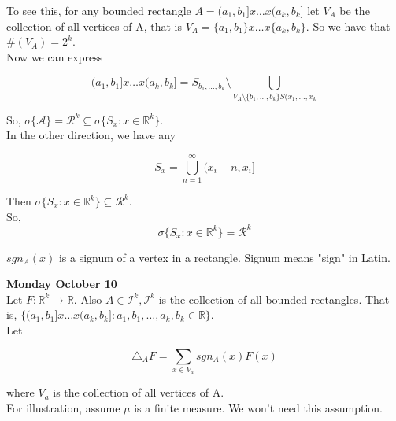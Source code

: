 \documentclass[11pt,fleqn]{book} %
\begin{document}
 To see this, for any bounded rectangle $A = (a_1, b_1] x \dots x (a_k, b_k]$ let $V_A$ be the collection of all vertices of A, that is $V_A = \{a_1, b_1 \} x \dots x \{a_k, b_k\}$. So we have that $\#(V_A) = 2^k$.\\



 Now  we can express 

 		$$(a_1, b_1] x \dots x (a_k, b_k] = S_{b_1, \dots, b_k} \setminus \bigcup_{V_A \setminus \{b_1, \dots, b_k\} S(x_1, \dots, x_k} $$

 So, $\sigma\{\mathcal{A}\} = \mathcal{R}^k \subseteq \sigma \{S_x: x \in \mathbb{R}^k \}$.\\

 In the other direction,  we have any 

 		$$S_x = \bigcup_{n=1}^\infty (x_i -n, x_i]$$

 Then $\sigma \{S_x: x \in \mathbb{R}^k \} \subseteq \mathcal{R}^k$.\\
 
 So, 
 		$$\sigma \{S_x: x \in \mathbb{R}^k \} = \mathcal{R}^k$$



\begin{notation}[Signum]
	$sgn_A (x)$ is a signum of a vertex in a rectangle. Signum means "sign" in Latin.\\



\end{notation}


\textbf{Monday October 10}\\

Let $F: \mathbb{R}^k \rightarrow \mathbb{R}$. Also $A \in \mathcal{I}^k, \mathcal{I}^k$ is the collection of all bounded rectangles. That is, $\{(a_1, b_1]x \dots x (a_k, b_k]: a_1, b_1, \dots, a_k, b_k \in \mathbb{R}\}$.\\

Let 

		$$\triangle_A F = \sum_{x \in V_a} sgn_A (x) F(x)$$

where $V_a$ is the collection of all vertices of A. \\

For illustration, assume $\mu$ is a finite measure. We won't need this assumption. \\
\end{document}
